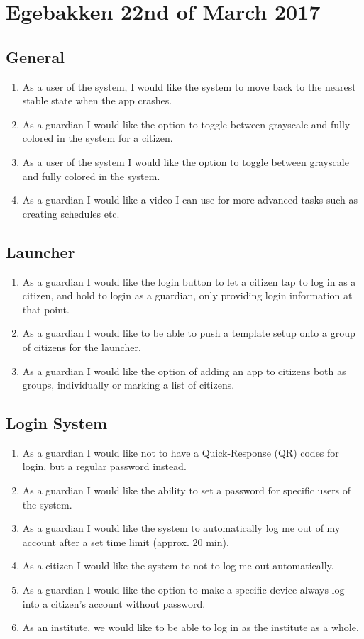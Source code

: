 \newpage
\section{Egebakken 22nd of March 2017}
\subsection*{General}

\begin{enumerate}
  \setlength\itemsep{0em}
  \item As a user of the system, I would like the system to move back to the nearest stable state when the app crashes.
  \item As a guardian I would like the option to toggle between grayscale and fully colored in the system for a citizen.
  \item As a user of the system I would like the option to toggle between grayscale and fully colored in the system.
  \item As a guardian I would like a video I can use for more advanced tasks such as creating schedules etc.
\end{enumerate}

\subsection*{Launcher}
\begin{enumerate}
  \setlength\itemsep{0em}
  \item As a guardian I would like the login button to let a citizen tap to log in as a citizen, and hold to login as a guardian, only providing login information at that point.
  \item As a guardian I would like to be able to push a template setup onto a group of citizens for the launcher.
  \item As a guardian I would like the option of adding an app to citizens both as groups, individually or marking a list of citizens.
\end{enumerate}

\subsection*{Login System}
\begin{enumerate}
  \setlength\itemsep{0em}
  \item As a guardian I would like not to have a Quick-Response (QR) codes for login, but a regular password instead.
  \item As a guardian I would like the ability to set a password for specific users of the system.
  \item As a guardian I would like the system to automatically log me out of my account after a set time limit (approx. 20 min).
  \item As a citizen I would like the system to not to log me out automatically.
  \item As a guardian I would like the option to make a specific device always log into a citizen's account without password.
  \item As an institute, we would like to be able to log in as the institute as a whole.
\end{enumerate}

